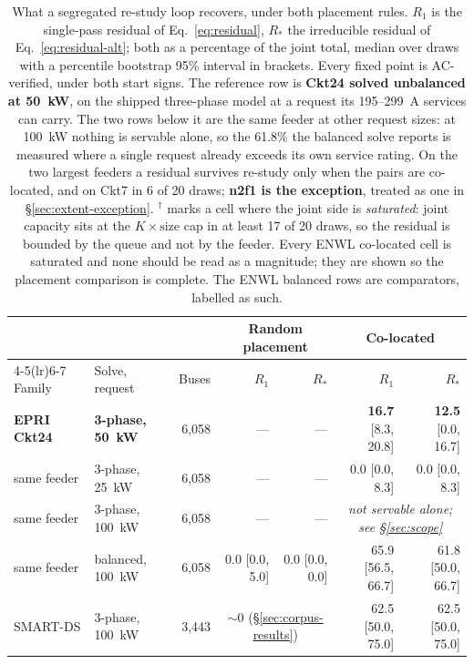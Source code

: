 \documentclass[review,authoryear,12pt]{elsarticle}
\begin{document}
\begin{table}[htbp]
\centering
\caption{What a segregated re-study loop recovers, under both placement rules.
$R_{1}$ is the single-pass residual of Eq.~\eqref{eq:residual}, $R_{\ast}$ the
irreducible residual of Eq.~\eqref{eq:residual-alt}; both as a percentage of
the joint total, median over draws with a percentile bootstrap 95\% interval in
brackets. Every fixed point is AC-verified, under both start signs. The
reference row is \textbf{Ckt24 solved unbalanced at 50~kW}, on the shipped
three-phase model at a request its 195--299~A services can carry. The two rows
below it are the same feeder at other request sizes: at 100~kW nothing is
servable alone, so the 61.8\% the balanced solve reports is measured where a
single request already exceeds its own service rating. On the two largest
feeders a residual survives re-study only when the pairs are co-located, and on
Ckt7 in 6 of 20 draws; \textbf{n2f1 is the exception}, treated as one in
\S\ref{sec:extent-exception}.
$^{\dagger}$ marks a cell where the joint side is \emph{saturated}: joint
capacity sits at the $K \times \text{size}$ cap in at least 17 of 20 draws, so
the residual is bounded by the queue and not by the feeder. Every ENWL
co-located cell is saturated and none should be read as a magnitude; they are
shown so the placement comparison is complete. The ENWL balanced rows are
comparators, labelled as such.}
\label{tab:alternation}
\scriptsize
\begin{tabular}{@{}llrrrrr@{}}
\toprule
& & & \multicolumn{2}{c}{Random placement} & \multicolumn{2}{c}{Co-located} \\
\cmidrule(lr){4-5}\cmidrule(lr){6-7}
Family & Solve, request & Buses & $R_{1}$ & $R_{\ast}$ & $R_{1}$ & $R_{\ast}$ \\
\midrule
\textbf{EPRI Ckt24} & \textbf{3-phase, 50~kW} & 6{,}058 & --- & --- & \textbf{16.7} [8.3, 20.8] & \textbf{12.5} [0.0, 16.7] \\
\quad same feeder    & 3-phase, 25~kW & 6{,}058 & --- & --- & 0.0 [0.0, 8.3] & 0.0 [0.0, 8.3] \\
\quad same feeder    & 3-phase, 100~kW & 6{,}058 & --- & --- & \multicolumn{2}{c}{\emph{not servable alone; see \S\ref{sec:scope}}} \\
\quad same feeder    & balanced, 100~kW & 6{,}058 & 0.0 [0.0, 5.0] & 0.0 [0.0, 0.0] & 65.9 [56.5, 66.7] & 61.8 [50.0, 66.7] \\
SMART-DS            & 3-phase, 100~kW & 3{,}443 & \multicolumn{2}{c}{$\sim$0 (\S\ref{sec:corpus-results})} & 62.5 [50.0, 75.0] & 62.5 [50.0, 75.0] \\

\end{tabular}
\end{table}
\end{document}
